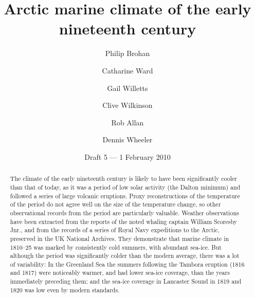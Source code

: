 \documentclass[CP]{copernicus}
\begin{document}
\title{Arctic marine climate of the early nineteenth century}


\author[1]{Philip Brohan}
\author[2]{Catharine Ward}
\author[1]{Gail Willetts}
\author[3]{Clive Wilkinson}
\author[1]{Rob Allan}
\author[2]{Dennis Wheeler}
\date{Draft 5 --- 1 February 2010}



\maketitle

\begin{abstract}

The climate of the early nineteenth century is likely to have been significantly cooler than that of today, as it was a period of low solar activity (the Dalton minimum) and followed a series of large volcanic eruptions. Proxy reconstructions of the temperature of the period do not agree well on the size of the temperature change, so other observational records from the period are particularly valuable. Weather observations have been extracted from the reports of the noted whaling captain William Scoresby Jnr., and from the records of a series of Royal Navy expeditions to the Arctic, preserved in the UK National Archives. They demonstrate that marine climate in 1810--25 was marked by consistently cold summers, with abundant sea-ice. But although the period was significantly colder than the modern average, there was a lot of variability: In the Greenland Sea the summers following the Tambora eruption (1816 and 1817) were noticeably warmer, and had lower sea-ice coverage, than the years immediately preceding them; and the sea-ice coverage in Lancaster Sound in 1819 and 1820 was low even by modern standards.
\end{abstract}

\introduction
\end{document}
